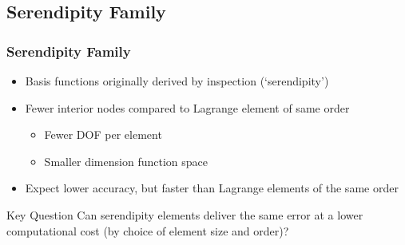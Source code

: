 \documentclass[serif,12pt]{beamer}
\begin{document}
\subsection{Serendipity Family}
\begin{frame}
\frametitle{Serendipity Family}
	\begin{itemize}
		\item Basis functions originally derived by inspection (`serendipity')
		\item Fewer interior nodes compared to Lagrange element of same order
		\begin{itemize}
			\item Fewer DOF per element
			\item Smaller dimension function space
		\end{itemize}
		\item Expect lower accuracy, but faster than Lagrange elements of the same order
	\end{itemize}
	\begin{block}{Key Question}
		Can serendipity elements deliver the same error at a lower computational cost (by choice of element size and order)?
	\end{block}
\end{frame}
\end{document}
